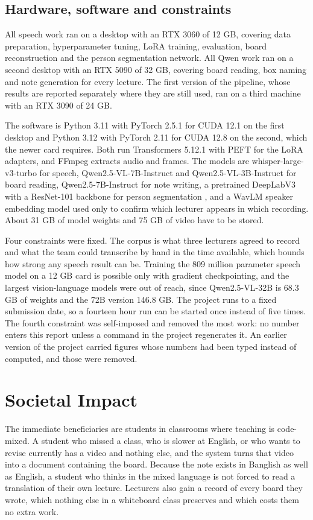 \subsection{Hardware, software and constraints}

All speech work ran on a desktop with an RTX 3060 of 12 GB, covering data preparation,
hyperparameter tuning, LoRA training, evaluation, board reconstruction and the person
segmentation network. All Qwen work ran on a second desktop with an RTX 5090 of 32 GB,
covering board reading, box naming and note generation for every lecture. The first
version of the pipeline, whose results are reported separately where they are still used,
ran on a third machine with an RTX 3090 of 24 GB.

The software is Python 3.11 with PyTorch 2.5.1 for CUDA 12.1 on the first desktop and
Python 3.12 with PyTorch 2.11 for CUDA 12.8 on the second, which the newer card requires.
Both run Transformers 5.12.1 with PEFT for the LoRA adapters, and FFmpeg extracts audio
and frames. The models are whisper-large-v3-turbo for speech, Qwen2.5-VL-7B-Instruct and
Qwen2.5-VL-3B-Instruct for board reading, Qwen2.5-7B-Instruct for note writing, a
pretrained DeepLabV3 with a ResNet-101 backbone for person segmentation
\cite{chen2017deeplabv3}, and a WavLM speaker embedding model used only to confirm which
lecturer appears in which recording. About 31 GB of model weights and 75 GB of video have
to be stored.

Four constraints were fixed. The corpus is what three lecturers agreed to record and what
the team could transcribe by hand in the time available, which bounds how strong any
speech result can be. Training the 809 million parameter speech model on a 12 GB card is
possible only with gradient checkpointing, and the largest vision-language models were
out of reach, since Qwen2.5-VL-32B is 68.3 GB of weights and the 72B version 146.8 GB. The
project runs to a fixed submission date, so a fourteen hour run can be started once
instead of five times. The fourth constraint was self-imposed and removed the most work:
no number enters this report unless a command in the project regenerates it. An earlier
version of the project carried figures whose numbers had been typed instead of computed,
and those were removed.

\section{Societal Impact}

The immediate beneficiaries are students in classrooms where teaching is code-mixed. A
student who missed a class, who is slower at English, or who wants to revise currently has
a video and nothing else, and the system turns that video into a document containing the
board. Because the note exists in Banglish as well as English, a student who thinks in the
mixed language is not forced to read a translation of their own lecture. Lecturers also
gain a record of every board they wrote, which nothing else in a whiteboard class
preserves and which costs them no extra work.

